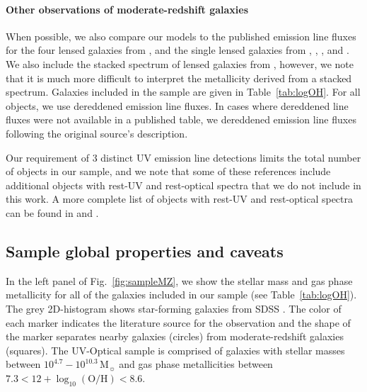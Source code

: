 \documentclass[preprint2]{aastex62}
\newcommand\Msun{\ensuremath{\mathrm{M_{\sun}}}\xspace}
\newcommand{\logten}{\ensuremath{\log_{10}}}
\newcommand{\logOH}{\ensuremath{\logten (\mathrm{O}/\mathrm{H})}\xspace}
\begin{document}
\paragraph{Other observations of moderate-redshift galaxies} When possible, we also compare our models to the published emission line fluxes for the four lensed galaxies from \citet{Stark+2014}, and the single lensed galaxies from \citet{Erb+2010}, \citet{Christensen+2012}, \citet{Bayliss+2014}, and \citet{Berg+2018}. We also include the stacked spectrum of lensed galaxies from \citet{Steidel+2016}, however, we note that it is much more difficult to interpret the metallicity derived from a stacked spectrum. Galaxies included in the sample are given in Table~\ref{tab:logOH}. For all objects, we use dereddened emission line fluxes. In cases where dereddened line fluxes were not available in a published table, we dereddened emission line fluxes following the original source's description.

Our requirement of 3 distinct UV emission line detections limits the total number of objects in our sample, and we note that some of these references include additional objects with rest-UV and rest-optical spectra \citep[e.g.,][]{Christensen+2012} that we do not include in this work. A more complete list of objects with rest-UV and rest-optical spectra can be found in \citet{Patricio+2019} and \citet{Plat+2019}. 

\subsection{Sample global properties and caveats}\label{sec:data:caveats}

In the left panel of Fig.~\ref{fig:sampleMZ}, we show the stellar mass and gas phase metallicity for all of the galaxies included in our sample (see Table~\ref{tab:logOH}). The grey 2D-histogram shows star-forming galaxies from SDSS \citep[DR7;][]{Abazajian+2009}. The color of each marker indicates the literature source for the observation and the shape of the marker separates nearby galaxies (circles) from moderate-redshift galaxies (squares). The UV-Optical sample is comprised of galaxies with stellar masses between $10^{4.7} - 10^{10.3}$\,\Msun and gas phase metallicities between $7.3 < 12+\logOH < 8.6$.
\end{document}
